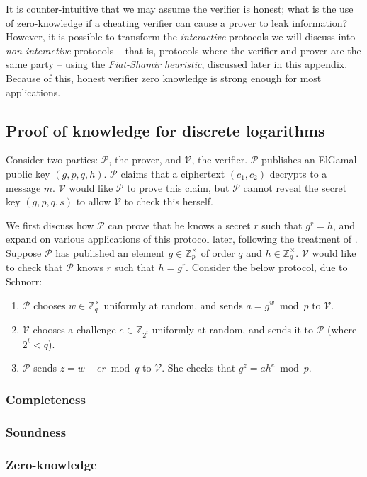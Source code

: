\documentclass[11pt,twoside,a4paper]{article}
\theoremstyle{definition}
\begin{document}
It is counter-intuitive that we may assume the verifier is honest; what is the use of zero-knowledge if a cheating verifier can cause a prover to leak information? However, it is possible to transform the \textit{interactive} protocols we will discuss into \textit{non-interactive} protocols -- that is, protocols where the verifier and prover are the same party -- using the \textit{Fiat-Shamir heuristic}, discussed later in this appendix. Because of this, honest verifier zero knowledge is strong enough for most applications.
\subsection{Proof of knowledge for discrete logarithms}
Consider two parties: $\mathcal{P}$, the prover, and $\mathcal{V}$, the verifier. $\mathcal{P}$ publishes an ElGamal public key $(g,p,q,h)$. $\mathcal{P}$ claims that a ciphertext $(c_1, c_2)$ decrypts to a message $m$. $\mathcal{V}$ would like $\mathcal{P}$ to prove this claim, but $\mathcal{P}$ cannot reveal the secret key $(g,p,q,s)$ to allow $\mathcal{V}$ to check this herself.

We first discuss how $\mathcal{P}$ can prove that he knows a secret $r$ such that $g^r=h$, and expand on various applications of this protocol later, following the treatment of \cite{damgaard2002sigma}. Suppose $\mathcal{P}$ has published an element $g\in\mathbb{Z}^\times_p$ of order $q$ and $h\in\mathbb{Z}^\times_q$. $\mathcal{V}$ would like to check that $\mathcal{P}$ knows $r$ such that $h=g^r$. Consider the below protocol, due to Schnorr:
\begin{enumerate}
    \item $\mathcal{P}$ chooses $w\in\mathbb{Z}^\times_q$ uniformly at random, and sends $a=g^w\bmod p$ to $\mathcal{V}$.
    \item $\mathcal{V}$ chooses a challenge $e\in\mathbb{Z}_{2^t}$ uniformly at random, and sends it to $\mathcal{P}$ (where $2^t<q$).
    \item $\mathcal{P}$ sends $z=w+er\bmod q$ to $\mathcal{V}$. She checks that $g^z=ah^e\bmod p$.
\end{enumerate}
\subsubsection{Completeness}
\subsubsection{Soundness}
\subsubsection{Zero-knowledge}
\end{document}

